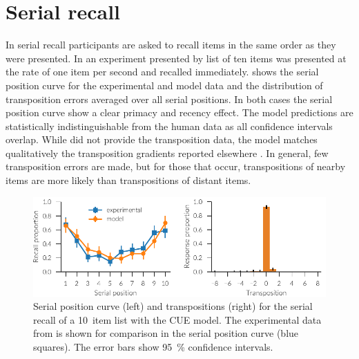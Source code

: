 \section{Serial recall}
In serial recall participants are asked to recall items in the same order as they were presented.
In an experiment presented by \textcite{Jahnke1968} list of ten items was presented at the rate of one item per second and recalled immediately.
 shows the serial position curve for the experimental and model data and the distribution of transposition errors averaged over all serial positions.
In both cases the serial position curve show a clear primacy and recency effect.
The model predictions are statistically indistinguishable from the human data as all confidence intervals overlap.
While \textcite{Jahnke1968} did not provide the transposition data, the model matches qualitatively the transposition gradients reported elsewhere \parencite{Henson1996}.
In general, few transposition errors are made, but for those that occur, transpositions of nearby items are more likely than transpositions of distant items.
\begin{figure}
    \centering
    \includegraphics{figures/results/serial}
    \caption[Serial position curve and transpositions for serial recall with the CUE model]{Serial position curve (left) and transpositions (right) for the serial recall of a \num{10}~item list with the CUE model. The experimental data from \textcite{Jahnke1968} is shown for comparison in the serial position curve (blue squares). The error bars show \SI{95}{\percent} confidence intervals.}\label{fig:results-serial}
\end{figure}

